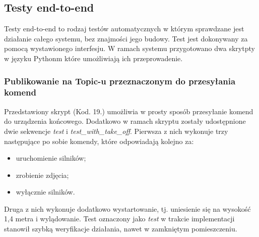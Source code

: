 \subsection{Testy end-to-end}

Testy end-to-end to rodzaj testów automatycznych w którym sprawdzane jest działanie całego systemu, bez znajmości jego budowy. Test jest dokonywany za pomocą wystawionego interfesju. W ramach systemu przygotowano dwa skrytpty w języku Pythonm które umożliwiają ich przeprowadenie. 

\subsubsection{Publikowanie na Topic-u przeznaczonym do przesyłania komend} 

Przedstawiony skrypt (Kod. 19.) umożliwia w prosty sposób przesyłanie komend do urządzenia końcowego. Dodatkowo w ramach skryptu zostały udostępnione dwie sekwencje \textit{test} i \textit{test\_with\_take\_off}. Pierwsza z nich wykonuje trzy następujące po sobie komendy, które odpowiadają kolejno za:
\begin{itemize}
  \item uruchomienie silników;
  \item zrobienie zdjęcia;
  \item wyłącznie silników.
\end{itemize}
Druga z nich wykonuje dodatkowo wystartowanie, tj. uniesienie się na wysokość 1,4 metra i wylądowanie. Test oznaczony jako \textit{test} w trakcie implementacji stanowił szybką weryfikacje działania, nawet w zamkniętym pomieszczeniu.

